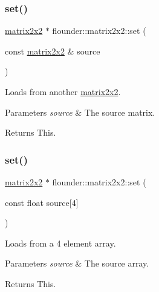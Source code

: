 \subsubsection{\texorpdfstring{set()}{set()}\hspace{0.1cm}{\footnotesize\ttfamily [1/2]}}
{\footnotesize\ttfamily \hyperlink{classflounder_1_1matrix2x2}{matrix2x2} $\ast$ flounder\+::matrix2x2\+::set (\begin{DoxyParamCaption}\item[{const \hyperlink{classflounder_1_1matrix2x2}{matrix2x2} \&}]{source }\end{DoxyParamCaption})}



Loads from another \hyperlink{classflounder_1_1matrix2x2}{matrix2x2}. 


\begin{DoxyParams}{Parameters}
{\em source} & The source matrix. \\
\hline
\end{DoxyParams}
\begin{DoxyReturn}{Returns}
This. 
\end{DoxyReturn}
\mbox{\label{classflounder_1_1matrix2x2_a9691dba556d6700ba3ed38522fd70820}} 
\subsubsection{\texorpdfstring{set()}{set()}\hspace{0.1cm}{\footnotesize\ttfamily [2/2]}}
{\footnotesize\ttfamily \hyperlink{classflounder_1_1matrix2x2}{matrix2x2} $\ast$ flounder\+::matrix2x2\+::set (\begin{DoxyParamCaption}\item[{const float}]{source\mbox{[}4\mbox{]} }\end{DoxyParamCaption})}



Loads from a 4 element array. 


\begin{DoxyParams}{Parameters}
{\em source} & The source array. \\
\hline
\end{DoxyParams}
\begin{DoxyReturn}{Returns}
This. 
\end{DoxyReturn}
\mbox{\label{classflounder_1_1matrix2x2_a2e44429f75483d0bf7b01fb7751eddd6}} 
